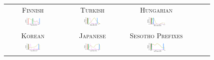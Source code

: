 \documentclass[man]{apa7}
\begin{document}
\begin{figure}
    \begin{center}
    \begin{tabular}{cccccc}
    \textsc{Finnish} & \textsc{Turkish} & \textsc{Hungarian} \\
        \includegraphics[width=0.3\textwidth]{figures/finnish_verbs/suffixes-byMorphemes-auc-hist-heldout-Coarse-FineSurprisal-optimized.pdf}
        &
    \includegraphics[width=0.3\textwidth]{figures/turkish_verbs/suffixes-byMorphemes-auc-hist-heldout-Coarse-FineSurprisal-optimized.pdf}
    &
    \includegraphics[width=0.3\textwidth]{figures/hungarian_verbs/suffixes-byMorphemes-auc-hist-heldout-Coarse-FineSurprisal-optimized.pdf}
    \\
    \textsc{Korean} & \textsc{Japanese} & \textsc{Sesotho Prefixes} \\
    \includegraphics[width=0.3\textwidth]{figures/korean/suffixes-byMorphemes-auc-hist-heldout-Coarse-FineSurprisal-optimized.pdf}
    &
        \includegraphics[width=0.3\textwidth]{figures/japanese/suffixes-byMorphemes-auc-hist-heldout-Coarse-FineSurprisal-optimized.pdf}
        &
            \includegraphics[width=0.3\textwidth]{figures/sesotho_prefixes/suffixes-byMorphemes-auc-hist-heldout-Coarse-FineSurprisal-optimized.pdf}

\end{tabular}
\end{center}
\end{figure}
\end{document}
